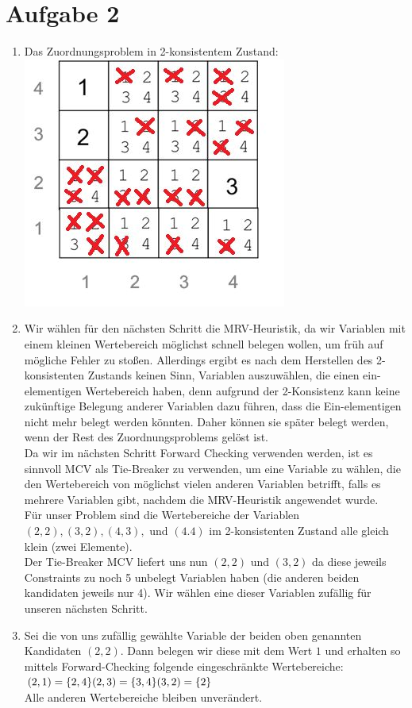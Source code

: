 \documentclass[a4paper,10pt]{article}
\begin{document}
\section*{Aufgabe 2}
\begin{enumerate}[~~a)]

\item
Das Zuordnungsproblem in 2-konsistentem Zustand: \\
\includegraphics[scale=0.7]{Aufgabe2a}

\item
Wir wählen für den nächsten Schritt die MRV-Heuristik, da wir Variablen mit einem kleinen Wertebereich möglichst schnell belegen wollen, um früh auf mögliche Fehler zu stoßen. Allerdings ergibt es nach dem Herstellen des 2-konsistenten Zustands keinen Sinn, Variablen auszuwählen, die einen ein-elementigen Wertebereich haben, denn aufgrund der 2-Konsistenz kann keine zukünftige Belegung anderer Variablen dazu führen, dass die Ein-elementigen nicht mehr belegt werden könnten. Daher können sie später belegt werden, wenn der Rest des Zuordnungsproblems gelöst ist. \\
Da wir im nächsten Schritt Forward Checking verwenden werden, ist es sinnvoll MCV als Tie-Breaker zu verwenden, um eine Variable zu wählen, die den Wertebereich von möglichst vielen anderen Variablen betrifft, falls es mehrere Variablen gibt, nachdem die MRV-Heuristik angewendet wurde.\\
Für unser Problem sind die Wertebereiche der Variablen $(2,2), (3,2), (4,3),$ und $(4.4)$ im 2-konsistenten Zustand alle gleich klein (zwei Elemente). \\
Der Tie-Breaker MCV liefert uns nun $(2,2)$ und $(3,2)$ da diese jeweils Constraints zu noch 5 unbelegt Variablen haben (die anderen beiden kandidaten jeweils nur 4). Wir wählen eine dieser Variablen zufällig für unseren nächsten Schritt.\\
\item
Sei die von uns zufällig gewählte Variable der beiden oben genannten Kandidaten $(2,2)$. Dann belegen wir diese mit dem Wert $1$ und erhalten so mittels Forward-Checking folgende eingeschränkte Wertebereiche: \\
$(2,1) = \{2,4\} \\
(2,3) = \{ 3,4\} \\
(3,2) = \{2\}$\\
Alle anderen Wertebereiche bleiben unverändert.
\end{enumerate}
\end{document}
